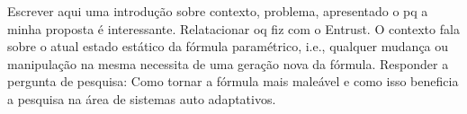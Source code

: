 Escrever aqui uma introdução sobre contexto, problema, apresentado o pq a minha proposta é interessante. Relatacionar oq fiz com o Entrust. O contexto fala sobre o atual estado estático da fórmula paramétrico, i.e., qualquer mudança ou manipulação na mesma necessita de uma geração nova da fórmula. Responder a pergunta de pesquisa: Como tornar a fórmula mais maleável e como isso beneficia a pesquisa na área de sistemas auto adaptativos.